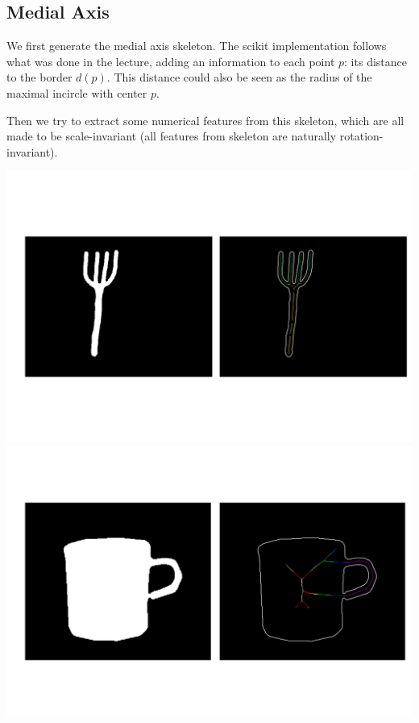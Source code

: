 \documentclass[12pt]{article}
\begin{document}
\subsection{Medial Axis}
We first generate the medial axis skeleton. The scikit implementation \cite{medial_axis} follows what was done in the lecture, adding an information to each point $p$: its distance to the border $d(p)$. This distance could also be seen as the radius of the maximal incircle with center $p$.

Then we try to extract some numerical features from this skeleton, which are all made to be scale-invariant (all features from skeleton are naturally rotation-invariant).

\includegraphics[scale=0.25]{fork_75.png}
\includegraphics[scale=0.25]{cup_476.png}

\vspace{12px}
\end{document}
